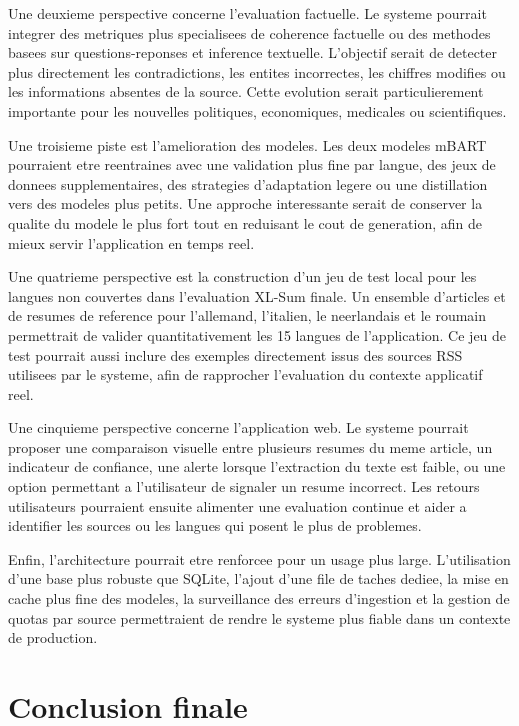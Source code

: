 Une deuxieme perspective concerne l'evaluation factuelle. Le systeme pourrait integrer des metriques plus specialisees de coherence factuelle ou des methodes basees sur questions-reponses et inference textuelle. L'objectif serait de detecter plus directement les contradictions, les entites incorrectes, les chiffres modifies ou les informations absentes de la source. Cette evolution serait particulierement importante pour les nouvelles politiques, economiques, medicales ou scientifiques.

Une troisieme piste est l'amelioration des modeles. Les deux modeles mBART pourraient etre reentraines avec une validation plus fine par langue, des jeux de donnees supplementaires, des strategies d'adaptation legere ou une distillation vers des modeles plus petits. Une approche interessante serait de conserver la qualite du modele le plus fort tout en reduisant le cout de generation, afin de mieux servir l'application en temps reel.

Une quatrieme perspective est la construction d'un jeu de test local pour les langues non couvertes dans l'evaluation XL-Sum finale. Un ensemble d'articles et de resumes de reference pour l'allemand, l'italien, le neerlandais et le roumain permettrait de valider quantitativement les 15 langues de l'application. Ce jeu de test pourrait aussi inclure des exemples directement issus des sources RSS utilisees par le systeme, afin de rapprocher l'evaluation du contexte applicatif reel.

Une cinquieme perspective concerne l'application web. Le systeme pourrait proposer une comparaison visuelle entre plusieurs resumes du meme article, un indicateur de confiance, une alerte lorsque l'extraction du texte est faible, ou une option permettant a l'utilisateur de signaler un resume incorrect. Les retours utilisateurs pourraient ensuite alimenter une evaluation continue et aider a identifier les sources ou les langues qui posent le plus de problemes.

Enfin, l'architecture pourrait etre renforcee pour un usage plus large. L'utilisation d'une base plus robuste que SQLite, l'ajout d'une file de taches dediee, la mise en cache plus fine des modeles, la surveillance des erreurs d'ingestion et la gestion de quotas par source permettraient de rendre le systeme plus fiable dans un contexte de production.

\section{Conclusion finale}


